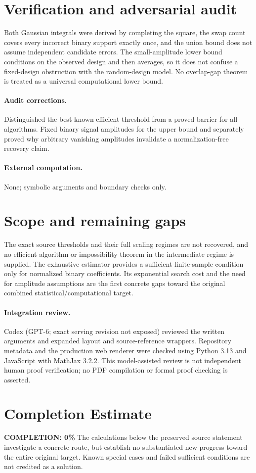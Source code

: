 \documentclass[11pt]{article}
\begin{document}
\section{Verification and adversarial audit}
Both Gaussian integrals were derived by completing the square, the swap count covers every incorrect binary support exactly once, and the union bound does not assume independent candidate errors. The small-amplitude lower bound conditions on the observed design and then averages, so it does not confuse a fixed-design obstruction with the random-design model. No overlap-gap theorem is treated as a universal computational lower bound.
\paragraph{Audit corrections.} Distinguished the best-known efficient threshold from a proved barrier for all algorithms. Fixed binary signal amplitudes for the upper bound and separately proved why arbitrary vanishing amplitudes invalidate a normalization-free recovery claim.
\paragraph{External computation.} None; symbolic arguments and boundary checks only.
\section{Scope and remaining gaps}
The exact source thresholds and their full scaling regimes are not recovered, and no efficient algorithm or impossibility theorem in the intermediate regime is supplied. The exhaustive estimator provides a sufficient finite-sample condition only for normalized binary coefficients. Its exponential search cost and the need for amplitude assumptions are the first concrete gaps toward the original combined statistical/computational target.
\paragraph{Integration review.} Codex (GPT-6; exact serving revision not exposed) reviewed the written arguments and expanded layout and source-reference wrappers. Repository metadata and the production web renderer were checked using Python 3.13 and JavaScript with MathJax 3.2.2. This model-assisted review is not independent human proof verification; no PDF compilation or formal proof checking is asserted.

\section{Completion Estimate}
\noindent\textbf{COMPLETION: 0\%}
The calculations below the preserved source statement investigate a concrete route,
but establish no substantiated new progress toward the entire original target.
Known special cases and failed sufficient conditions are not credited as a solution.
\end{document}
